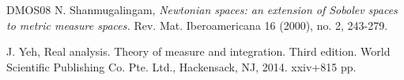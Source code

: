 \documentclass[10pt]{amsart}
\numberwithin{equation}{section}
\begin{document}
\begin{thebibliography}{DMOS08}
 N. Shanmugalingam, \emph{Newtonian spaces: an extension of Sobolev spaces to metric measure spaces.} Rev. Mat. Iberoamericana 16 (2000), no. 2, 243-279. 




 J. Yeh, Real analysis. Theory of measure and integration. Third edition. World Scientific Publishing Co. Pte. Ltd., Hackensack, NJ, 2014. xxiv+815 pp. 

\end{thebibliography}

% 
% 
% 
 
\end{document}
